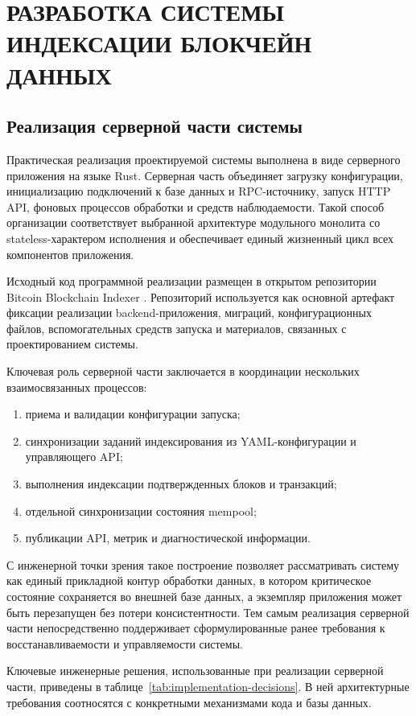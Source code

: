 ﻿\section{РАЗРАБОТКА СИСТЕМЫ ИНДЕКСАЦИИ БЛОКЧЕЙН ДАННЫХ}

\subsection{Реализация серверной части системы}

Практическая реализация проектируемой системы выполнена в виде серверного
приложения на языке Rust. Серверная часть объединяет загрузку конфигурации,
инициализацию подключений к базе данных и RPC-источнику, запуск HTTP API,
фоновых процессов обработки и средств наблюдаемости. Такой способ
организации соответствует выбранной архитектуре модульного монолита со
stateless-характером исполнения и обеспечивает единый жизненный цикл всех
компонентов приложения.

Исходный код программной реализации размещен в открытом репозитории
Bitcoin Blockchain Indexer \cite{project_github}. Репозиторий используется как
основной артефакт фиксации реализации backend-приложения, миграций,
конфигурационных файлов, вспомогательных средств запуска и материалов,
связанных с проектированием системы.

Ключевая роль серверной части заключается в координации нескольких
взаимосвязанных процессов:
\begin{enumerate}
    \item приема и валидации конфигурации запуска;
    \item синхронизации заданий индексирования из YAML-конфигурации и управляющего API;
    \item выполнения индексации подтвержденных блоков и транзакций;
    \item отдельной синхронизации состояния mempool;
    \item публикации API, метрик и диагностической информации.
\end{enumerate}

С инженерной точки зрения такое построение позволяет рассматривать систему как
единый прикладной контур обработки данных, в котором критическое состояние
сохраняется во внешней базе данных, а экземпляр приложения может быть
перезапущен без потери консистентности. Тем самым реализация серверной части
непосредственно поддерживает сформулированные ранее требования к
восстанавливаемости и управляемости системы.

Ключевые инженерные решения, использованные при реализации серверной части,
приведены в таблице~\ref{tab:implementation-decisions}. В ней архитектурные
требования соотносятся с конкретными механизмами кода и базы данных.

